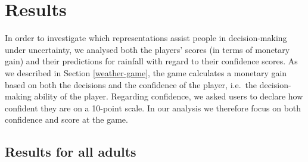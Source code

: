 \documentclass[11pt]{article}
\begin{document}
\section{Results} \label{results}



In order to investigate which representations assist people in decision-making under uncertainty, we analysed both the players' scores (in terms of monetary gain) and their predictions for rainfall with regard to their confidence scores.
 As we described in Section \ref{weather-game}, the game calculates a monetary gain based on both the decisions and the confidence of the player, i.e.\ the decision-making ability of the player.
Regarding confidence,  we asked users to declare how confident they are on a 10-point scale. 
 In our analysis %
 we therefore focus on both confidence and score at the game.




\subsection{Results for all adults} %
\end{document}
